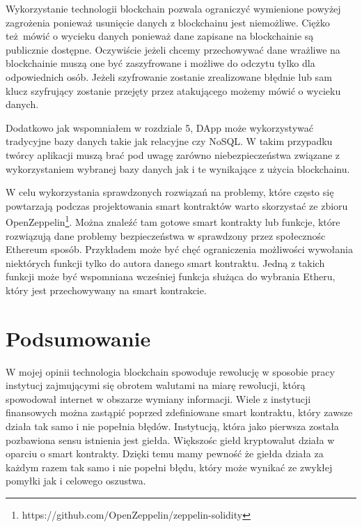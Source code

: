 \documentclass[]{llncs}
\renewcommand{\cite}[1]{~\oldcite{#1}}
\begin{document}
  Wykorzystanie technologii blockchain pozwala ograniczyć wymienione powyżej
  zagrożenia ponieważ usunięcie danych z blockchainu jest niemożliwe. Ciężko
  też mówić o wycieku danych ponieważ dane zapisane na blockchainie są
  publicznie dostępne. Oczywiście jeżeli chcemy przechowywać dane wrażliwe na
  blockchainie muszą one być zaszyfrowane i możliwe do odczytu tylko dla
  odpowiednich osób. Jeżeli szyfrowanie zostanie zrealizowane błędnie lub sam
  klucz szyfrujący zostanie przejęty przez atakującego możemy mówić o wycieku
  danych.

  Dodatkowo jak wspomniałem w rozdziale 5, DApp może wykorzystywać tradycyjne
  bazy danych takie jak relacyjne czy NoSQL. W takim przypadku twórcy aplikacji
  muszą brać pod uwagę zarówno niebezpieczeństwa związane z wykorzystaniem
  wybranej bazy danych jak i te wynikające z użycia blockchainu.

  W celu wykorzystania sprawdzonych rozwiązań na problemy, które często się
  powtarzają podczas projektowania smart kontraktów warto skorzystać ze zbioru
  OpenZeppelin\footnote{https://github.com/OpenZeppelin/zeppelin-solidity}.
  Można znaleźć tam gotowe smart kontrakty lub funkcje, które rozwiązują dane
  problemy bezpieczeństwa w sprawdzony przez społecznośc Ethereum sposób.
  Przykładem może być chęć ograniczenia możliwości wywołania niektórych funkcji
  tylko do autora danego smart kontraktu. Jedną z takich funkcji może być
  wspomniana wcześniej funkcja służąca do wybrania Etheru, który jest
  przechowywany na smart kontrakcie.



\section{Podsumowanie}

  W mojej opinii technologia blockchain spowoduje rewolucję w sposobie pracy
  instytucj zajmującymi się obrotem walutami na miarę rewolucji, którą
  spowodował internet w obszarze wymiany informacji. Wiele z instytucji
  finansowych można zastąpić poprzed zdefiniowane smart kontraktu, który zawsze
  działa tak samo i nie popełnia błędów. Instytucją, która jako pierwsza została
  pozbawiona sensu istnienia jest giełda. Większośc giełd kryptowalut działa w
  oparciu o smart kontrakty. Dzięki temu mamy pewność że giełda działa za każdym
  razem tak samo i nie popełni błędu, który może wynikać ze zwykłej pomyłki jak
  i celowego oszustwa.
\end{document}
